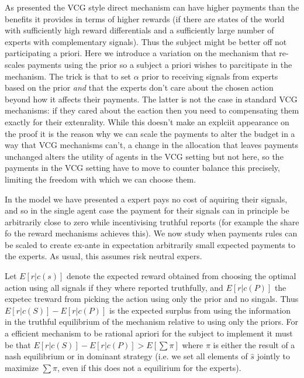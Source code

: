 As presented the VCG style direct mechanism can have higher payments than the benefits it provides in terms of higher rewards (if there are states of the world with sufficiently high reward differentials and a sufficiently large number of experts with complementary signals). Thus the subject might be better off not participating a priori. Here we introduce a variation on the mechanism that re-scales payments using the prior so a subject a priori wishes to parcitipate in the mechanism. The trick is that to set $\alpha$ prior to receiving signals from experts based on the prior \emph{and} that the experts don't care about the chosen action beyond how it affects their payments. The latter is not the case in standard VCG mechanisms: if they cared about the eaction then you need to compensating them exactly for their extenrality. While this doesn't make an explciit appearance on the proof it is the reason why we can scale the payments to alter the budget in a way that VCG mechanisms can't, a change in the allocation that leaves payments unchanged alters the utility of agents in the VCG setting but not here, so the payments in the VCG setting have to move to counter balance this precisely, limiting the freedom with which we can choose them.


In the model we have presented a expert pays no cost of aquiring their signals, and so in the single agent case the payment for their signals can in principle be arbitrarily close to zero while incentivising truthful reports (for example the share fo the reward mechanisms achieves this). We now study when payments rules can be scaled to create ex-ante in expectation arbitrarily small expected payments to the experts. As usual, this assumes risk neutral expers. 



Let $E[r|c(s)]$ denote the expected reward obtained from choosing the optimal action using all signals if they where reported truthfully, and $E[r|c(P)] $ the expetec treward from picking the action using only the prior and no singals. Thus $E[r|c(S)] - E[r|c(P)] $ is the expected surplus from using the information in the truthful equilibrium of the mechanism relative to using only the priors. For a efficient mechanism to be rational apriori for the subject to implement it must be that $E[r|c(S)] - E[r|c(P)] > E[\sum \pi]$ where $\pi$ is either the result of a nash equilibrium or in dominant strategy (i.e. we set all elements of $\hat{s}$ jointly to maximize $\sum \pi$, even if this does not a equilirium for the experts).

